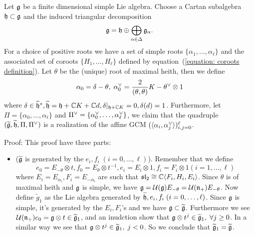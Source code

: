\begin{itemize}
\begin{dang}
    \begin{theorem}
        Let $\mathfrak{g}$ be a finite dimensional simple Lie algebra. Choose a Cartan subalgebra 
        $\mathfrak{h}\subset\mathfrak{g}$ and the induced triangular decomposition
        \begin{equation}
            \mathfrak{g} = \mathfrak{h}\oplus\bigoplus_{\alpha\in\Delta}\mathfrak{g}_\alpha.
        \end{equation} 
        For a choice of positive roots we have a set of simple roots $\{\alpha_1,\dots,\alpha_\ell\}$ and the associated
        set of coroots $\{H_1,\dots,H_\ell\}$ defined by equation~(\ref{equation: coroots definition}). 
        Let $\theta$ be the (unique) root of maximal heith, then we define 
        \begin{equation}
            \alpha_0 = \delta - \theta,\;\alpha^{\vee}_0 = \frac{2}{(\theta,\theta)}K - \theta^\vee\otimes1
        \end{equation}
        where $\delta\in\widetilde{\mathfrak{h}}^*,\widetilde{\mathfrak{h}}=\mathfrak{h}+\mathbb{C} K+\mathbb{C} d, \delta|_{\mathfrak{h}+\mathbb{C} K}=0,\delta(d)=1$. 
        Furthermore, let $\Pi=\{\alpha_0,\dots,\alpha_\ell\}$ and $\Pi^\vee=\{\alpha^{\vee}_0,\dots,\alpha^{\vee}_\ell\}$, we claim that 
        the quadruple $(\widetilde{\mathfrak{g}}, \widetilde{\mathfrak{h}},\Pi,\Pi^\vee)$ is a realization of the affine GCM 
        $(\langle\alpha_i,\alpha^{\vee}_j\rangle)_{i,j=0}^{\ell}$.
    \end{theorem}
\end{dang}
Proof: This proof have three parts:
\begin{itemize}
    \item($\widetilde{\mathfrak{g}}$ is generated by the $e_i,f_i\;(i=0,\dots,\ell)$). Remember that we define 
    \begin{equation}
        e_0 = E_{-\theta}\otimes t, f_0=E_{\theta}\otimes t^{-1}, e_i = E_i\otimes 1, f_i=F_i\otimes 1 (i=1,\dots,\ell)
    \end{equation}
    where $E_i = E_{\alpha_i}, F_i = E_{-\alpha_i}$ are such that $\mathfrak{sl}_2\cong\mathbb{C}\langle F_i,H_i,E_i\rangle$. Since 
    $\theta$ is of maximal heith and $\mathfrak{g}$ is simple, we have 
    $\mathfrak{g}=\mathcal{U}(\mathfrak{g})E_{-\theta}=\mathcal{U}(\mathfrak{n}_+)E_{-\theta}$. Now define $\widetilde{g}_1$ as the Lie 
    algebra generated by $\widetilde{\mathfrak{h}},e_i,f_i\;(i=0,\dots,\ell)$. Since $\mathfrak{g}$ is simple, it's generated by 
    the $E_i,F_i$'s and we have $\mathfrak{g}\subset\widetilde{\mathfrak{g}}$. 
    Furthermore we see $\mathcal{U}(\mathfrak{n}_+)e_0=\mathfrak{g}\otimes t\in\widetilde{\mathfrak{g}}_1$, and an inudction show that 
    $\mathfrak{g}\otimes t^{j}\in \widetilde{\mathfrak{g}}_1,\;\forall j\geq0$. In a similar way we see that 
    $\mathfrak{g}\otimes t^{j}\in\widetilde{\mathfrak{g}}_1,\;j<0$. So we conclude that $\widetilde{\mathfrak{g}}_1=\widetilde{\mathfrak{g}}$.


\end{itemize}
\end{itemize}
